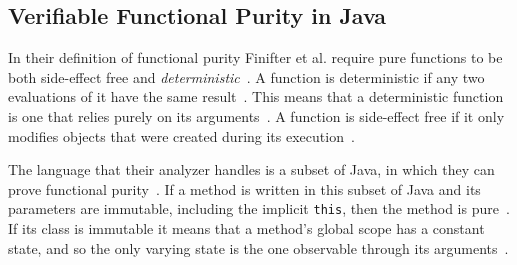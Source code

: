 \documentclass[a4paper,12pt]{article}
\begin{document}


\subsection{Verifiable Functional Purity in Java} \label{sub:Verifiable-Functional-Purity-in-Java}
In their definition of functional purity Finifter et al. require pure functions to be both side-effect free and \textit{deterministic}~\cite{purity-in-java}. A function is deterministic if any two evaluations of it have the same result~\cite{purity-in-java}. This means that a deterministic function is one that relies purely on its arguments~\cite{purity-in-java}. A function is side-effect free if it only modifies objects that were created during its execution~\cite{purity-in-java}.

The language that their analyzer handles is a subset of Java, in which they can prove functional purity~\cite{purity-in-java}. If a method is written in this subset of Java and its parameters are immutable, including the implicit \texttt{this}, then the method is pure~\cite{purity-in-java}. %
If its class is immutable it means that a method's global scope has a constant state, and so the only varying state is the one observable through its arguments~\cite{purity-in-java}.
\end{document}
